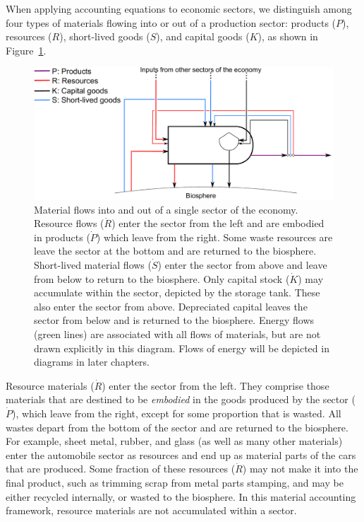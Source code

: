 When applying accounting equations to economic sectors,
we distinguish among four types of
materials flowing into or out of a production sector: 
products ($P$), resources ($R$),
short-lived goods ($S$),
and capital goods ($K$), 
as shown in Figure~\ref{fig:PERKS_materials}.

\begin{figure}[!ht]
\centering{}
\includegraphics[width=\linewidth]{Part_1/Chapter_Materials/images/PERKS_basic_unit_materials.pdf}
\caption[Material flows into and out of a single sector 
of the economy]{Material flows into and out of 
a single sector of the economy. 
Resource flows ($\dot{R}$) enter the sector from the left 
and are embodied in products ($\dot{P}$) which leave from the right. 
Some waste resources are leave the sector at the 
bottom and are returned to the biosphere.
Short-lived material flows ($\dot{S}$) 
enter the sector from above and leave from below to return to the biosphere. 
Only capital stock ($\dot{K}$) may accumulate within the sector,
depicted by the storage tank.
These also enter the sector from above. 
Depreciated capital leaves the sector from below and is returned to the biosphere.
Energy flows (green lines) are associated with all flows of materials, 
but are not drawn explicitly in this diagram. 
Flows of energy will be depicted in diagrams in later chapters.}
\label{fig:PERKS_materials}
\end{figure}

Resource materials ($\dot{R}$)
enter the sector from the left.
They comprise those materials that are destined to be \emph{embodied} 
in the goods produced by the sector ($\dot{P}$), which leave from the right,
except for some proportion that is wasted.
All wastes depart from the bottom of the sector and are
returned to the biosphere. 
For example, sheet metal, rubber, and glass
(as well as many other materials) 
enter the automobile sector as resources 
and end up as material parts of the cars that are produced. 
Some fraction of these resources ($\dot{R}$) may not make it into the final product, 
such as trimming scrap from metal parts stamping, 
and may be either recycled internally, 
or wasted to the biosphere. 
In this material accounting framework, 
resource materials are not accumulated within a sector.

